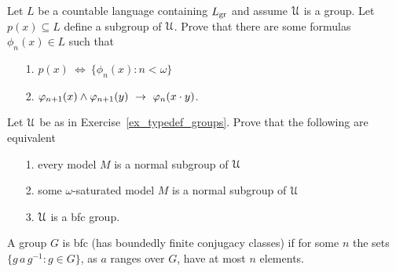\begin{exercise}\label{ex_typedef_groups}
  Let $L$ be a countable language containing $L_{\rm gr}$ and assume $\EuScript U$ is a group.
  Let $p(x)\subseteq L$ define a subgroup of $\EuScript U$.
  Prove that there are some formulas $\phi_n(x)\in L$ such that 
  \begin{itemize}
  \item[1.] $p(x)\ \iff\ \{\phi_n(x):n<\omega\}$
  \item[2.] $\phi_{n+1}(x)\wedge\phi_{n+1}(y)\ \imp\ \phi_n(x\cdot y)$.
  \end{itemize}
\end{exercise}

\begin{exercise}\label{ex_bfc_groups}
  Let $\EuScript U$ be as in Exercise~\ref{ex_typedef_groups}.
  Prove that the following are equivalent
  \begin{itemize}
    \item[1.] every model $M$ is a normal subgroup of $\EuScript U$
    \item[2.] some $\omega$-saturated model $M$ is a normal subgroup of $\EuScript U$
    \item[3.] $\EuScript U$ is a {\sc bfc} group.
  \end{itemize}
  A group $G$ is {\sc bfc} (has boundedly finite conjugacy classes) if for some $n$ the sets $\{g\,a\,g^{-1}:g\in G\}$, as $a$ ranges over $G$, have at most $n$ elements. 
\end{exercise}